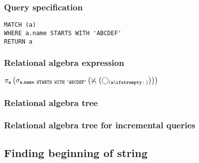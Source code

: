 \subsubsection*{Query specification}

\begin{lstlisting}
MATCH (a)
WHERE a.name STARTS WITH 'ABCDEF'
RETURN a
\end{lstlisting}

\subsubsection*{Relational algebra expression}

$\projection{\var{a}} \left(\selection{\mathtt{a.name~STARTS~WITH~'ABCDEF'}} \left(\alldifferent{} \left(\getvertices{a}{}\right)\right)\right)$

\subsubsection*{Relational algebra tree}


\subsubsection*{Relational algebra tree for incremental queries}


\subsection{Finding beginning of string}

